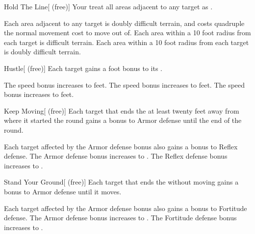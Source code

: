 {            \begin{freeability}{Hold The Line}[ (free)]
                Your  treat all areas adjacent to any target as .

                \rankline
                 Each area adjacent to any target is doubly difficult terrain, and costs quadruple the normal movement cost to move out of.
                 Each area within a 10 foot radius  from each target is difficult terrain.
                 Each area within a 10 foot radius  from each target is doubly difficult terrain.
            \end{freeability}

            \begin{freeability}{Hustle}[ (free)]
                Each target gains a  foot bonus to its .

                \rankline
                 The speed bonus increases to  feet.
                 The speed bonus increases to  feet.
                 The speed bonus increases to  feet.
            \end{freeability}

            \begin{freeability}{Keep Moving}[ (free)]
                Each target that ends the  at least twenty feet away from where it started the round
                    gains a  bonus to Armor defense until the end of the round.

                \rankline
                 Each target affected by the Armor defense bonus also gains a  bonus to Reflex defense.
                 The Armor defense bonus increases to .
                 The Reflex defense bonus increases to .
            \end{freeability}

            \begin{freeability}{Stand Your Ground}[ (free)]
                Each target that ends the  without moving gains a  bonus to Armor defense until it moves.

                \rankline
                 Each target affected by the Armor defense bonus also gains a  bonus to Fortitude defense.
                 The Armor defense bonus increases to .
                 The Fortitude defense bonus increases to .
            \end{freeability}
        }

